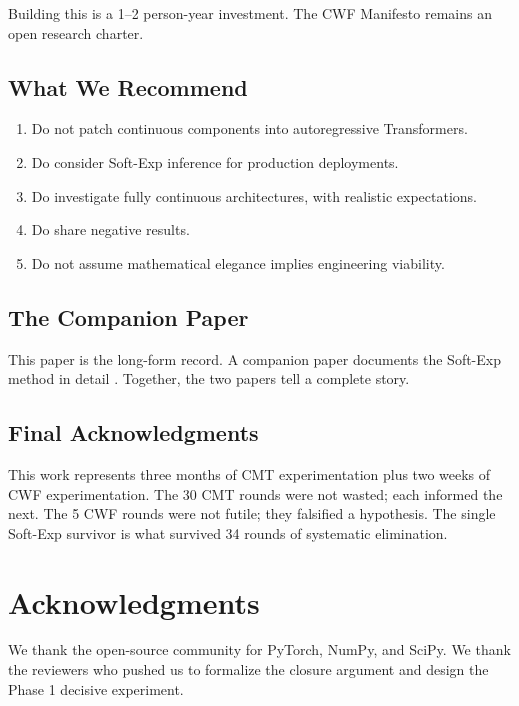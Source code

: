 \documentclass{article}
\begin{document}
Building this is a 1--2 person-year investment. The CWF Manifesto remains an open research charter.

\subsection{What We Recommend}

\begin{enumerate}
    \item Do not patch continuous components into autoregressive Transformers.
    \item Do consider Soft-Exp inference for production deployments.
    \item Do investigate fully continuous architectures, with realistic expectations.
    \item Do share negative results.
    \item Do not assume mathematical elegance implies engineering viability.
\end{enumerate}

\subsection{The Companion Paper}

This paper is the long-form record. A companion paper documents the Soft-Exp method in detail \citep{wang2026softexp}. Together, the two papers tell a complete story.

\subsection{Final Acknowledgments}

This work represents three months of CMT experimentation plus two weeks of CWF experimentation. The 30 CMT rounds were not wasted; each informed the next. The 5 CWF rounds were not futile; they falsified a hypothesis. The single Soft-Exp survivor is what survived 34 rounds of systematic elimination.

\section*{Acknowledgments}

We thank the open-source community for PyTorch, NumPy, and SciPy. We thank the reviewers who pushed us to formalize the closure argument and design the Phase 1 decisive experiment.
\end{document}
